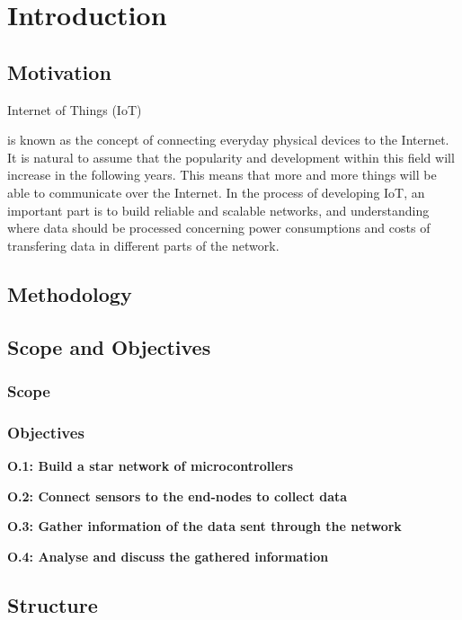 \chapter{Introduction}
\label{chp:introduction} 


\section{Motivation}

Internet of Things (IoT) 



is known as the concept of connecting everyday physical devices to the Internet. It is natural to assume that the popularity and development within this field will increase in the following years. This means that more and more things will be able to communicate over the Internet. In the process of developing IoT, an important part is to build reliable and scalable networks, and understanding where data should be processed concerning power consumptions and costs of transfering data in different parts of the network.

\section{Methodology}

\section{Scope and Objectives}

\subsection{Scope}

\subsection{Objectives}

\noindent \textbf{O.1: Build a star network of microcontrollers}

\noindent\textbf{O.2: Connect sensors to the end-nodes to collect data}

\noindent\textbf{O.3: Gather information of the data sent through the network}

\noindent\textbf{O.4: Analyse and discuss the gathered information}

\section{Structure}